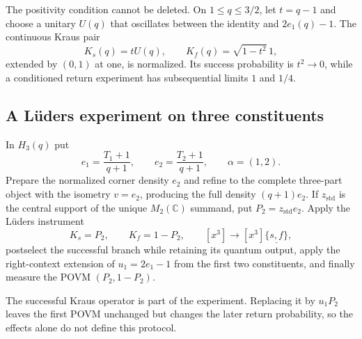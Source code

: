 The positivity condition cannot be deleted.  On $1\leq q\leq3/2$, let
$t=q-1$ and choose a unitary $U(q)$ that oscillates between the identity and
$2e_1(q)-1$.  The continuous Kraus pair
\[
 K_s(q)=tU(q),\qquad K_f(q)=\sqrt{1-t^2}\,1,
\]
extended by $(0,1)$ at one, is normalized.  Its success probability is
$t^2\to0$, while a conditioned return experiment has subsequential limits
$1$ and $1/4$.

\subsection{A Lüders experiment on three constituents}

\begin{definition}
In $H_3(q)$ put
\[
 e_1=\frac{T_1+1}{q+1},\qquad
 e_2=\frac{T_2+1}{q+1},\qquad \alpha=(1,2).
\]
Prepare the normalized corner density $e_2$ and refine to the complete
three-part object with the isometry $v=e_2$, producing the full density
$(q+1)e_2$.  If $z_{\mathrm{std}}$ is the central support of the unique
$M_2(\mathbb C)$ summand, put $P_2=z_{\mathrm{std}}e_2$.  Apply the Lüders
instrument
\[
 K_s=P_2,\qquad K_f=1-P_2,\qquad
 [x^3]\longrightarrow[x^3]\underline{\{s,f\}},
\]
postselect the successful branch while retaining its quantum output, apply
the right-context extension of $u_1=2e_1-1$ from the first two constituents,
and finally measure the POVM $(P_2,1-P_2)$.
\end{definition}
\begin{scope}
The successful Kraus operator is part of the experiment.  Replacing it by
$u_1P_2$ leaves the first POVM unchanged but changes the later return
probability, so the effects alone do not define this protocol.
\end{scope}

